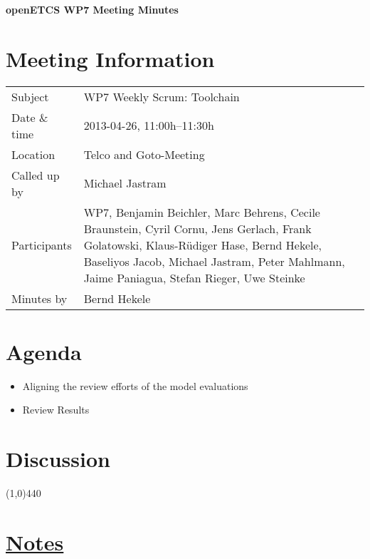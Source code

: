 \documentclass[a4paper, 11pt]{article}
\begin{document}
{\begin{center}\huge\bf openETCS WP7 Meeting Minutes\end{center}}
\section{Meeting Information}

\renewcommand{\arraystretch}{1.5}
\begin{supertabular}{m{.2\textwidth}m{.8\textwidth}}
Subject & WP7 Weekly Scrum: Toolchain\\
Date \& time & 2013-04-26, 11:00h--11:30h\\
Location & Telco and Goto-Meeting\\
Called up by & Michael Jastram\\
Participants & WP7,
Benjamin Beichler,
Marc Behrens,
Cecile Braunstein,
Cyril Cornu, 
Jens Gerlach, 
Frank Golatowski, 
Klaus-R\"udiger Hase,
Bernd Hekele,
Baseliyos Jacob,
Michael Jastram, 
Peter Mahlmann, 
Jaime Paniagua,
Stefan Rieger,
Uwe Steinke\\

Minutes by & Bernd Hekele\\

\end{supertabular}
\renewcommand{\arraystretch}{1.0}


\section{{Agenda}}
\begin{itemize}
\item Aligning the review efforts of the model evaluations
\item Review Results
\end{itemize}

\section{Discussion}


\line(1,0){440}
\section{\underline{Notes}}
\end{document}
